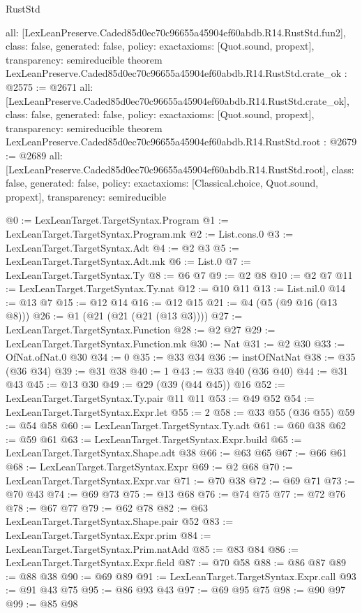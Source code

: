 \begin{lexlean}{RustStd}
\begin{coremodule}
{  all: [LexLeanPreserve.Caded85d0ec70c96655a45904ef60abdb.R14.RustStd.fun2],
  class: false,
  generated: false,
  policy: exact{axioms: [Quot.sound, propext]},
  transparency: semireducible
}
theorem LexLeanPreserve.Caded85d0ec70c96655a45904ef60abdb.R14.RustStd.crate_ok : @2575 := @2671 {
  all: [LexLeanPreserve.Caded85d0ec70c96655a45904ef60abdb.R14.RustStd.crate_ok],
  class: false,
  generated: false,
  policy: exact{axioms: [Quot.sound, propext]},
  transparency: semireducible
}
theorem LexLeanPreserve.Caded85d0ec70c96655a45904ef60abdb.R14.RustStd.root : @2679 := @2689 {
  all: [LexLeanPreserve.Caded85d0ec70c96655a45904ef60abdb.R14.RustStd.root],
  class: false,
  generated: false,
  policy: exact{axioms: [Classical.choice, Quot.sound, propext]},
  transparency: semireducible
}

@0 := LexLeanTarget.TargetSyntax.Program
@1 := LexLeanTarget.TargetSyntax.Program.mk
@2 := List.cons.{0}
@3 := LexLeanTarget.TargetSyntax.Adt
@4 := @2 @3
@5 := LexLeanTarget.TargetSyntax.Adt.mk
@6 := List.{0}
@7 := LexLeanTarget.TargetSyntax.Ty
@8 := @6 @7
@9 := @2 @8
@10 := @2 @7
@11 := LexLeanTarget.TargetSyntax.Ty.nat
@12 := @10 @11
@13 := List.nil.{0}
@14 := @13 @7
@15 := @12 @14
@16 := @12 @15
@21 := @4 (@5 (@9 @16 (@13 @8)))
@26 := @1 (@21 (@21 (@21 (@13 @3))))
@27 := LexLeanTarget.TargetSyntax.Function
@28 := @2 @27
@29 := LexLeanTarget.TargetSyntax.Function.mk
@30 := Nat
@31 := @2 @30
@33 := OfNat.ofNat.{0} @30
@34 := 0
@35 := @33 @34
@36 := instOfNatNat
@38 := @35 (@36 @34)
@39 := @31 @38
@40 := 1
@43 := @33 @40 (@36 @40)
@44 := @31 @43
@45 := @13 @30
@49 := @29 (@39 (@44 @45)) @16
@52 := LexLeanTarget.TargetSyntax.Ty.pair @11 @11
@53 := @49 @52
@54 := LexLeanTarget.TargetSyntax.Expr.let
@55 := 2
@58 := @33 @55 (@36 @55)
@59 := @54 @58
@60 := LexLeanTarget.TargetSyntax.Ty.adt
@61 := @60 @38
@62 := @59 @61
@63 := LexLeanTarget.TargetSyntax.Expr.build
@65 := LexLeanTarget.TargetSyntax.Shape.adt @38
@66 := @63 @65
@67 := @66 @61
@68 := LexLeanTarget.TargetSyntax.Expr
@69 := @2 @68
@70 := LexLeanTarget.TargetSyntax.Expr.var
@71 := @70 @38
@72 := @69 @71
@73 := @70 @43
@74 := @69 @73
@75 := @13 @68
@76 := @74 @75
@77 := @72 @76
@78 := @67 @77
@79 := @62 @78
@82 := @63 LexLeanTarget.TargetSyntax.Shape.pair @52
@83 := LexLeanTarget.TargetSyntax.Expr.prim
@84 := LexLeanTarget.TargetSyntax.Prim.natAdd
@85 := @83 @84
@86 := LexLeanTarget.TargetSyntax.Expr.field
@87 := @70 @58
@88 := @86 @87
@89 := @88 @38
@90 := @69 @89
@91 := LexLeanTarget.TargetSyntax.Expr.call
@93 := @91 @43 @75
@95 := @86 @93 @43
@97 := @69 @95 @75
@98 := @90 @97
@99 := @85 @98

\end{coremodule}
\end{lexlean}
